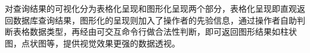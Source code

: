 \begin{CJK*}{UTF8}{song}

对查询结果的可视化分为表格化呈现和图形化呈现两个部分，表格化呈现即直观返回数据库查询结果，图形化的呈现则加入了操作者的先验信息，通过操作者自助判断表格数据类型，再经由可交互命令行做合法性判断，即可返回图形结果如柱状图，点状图等，提供视觉效果更强的数据透视。
\end{CJK*}